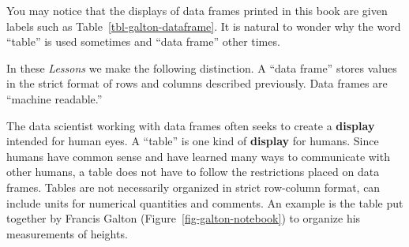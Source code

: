 \documentclass[
  letterpaper,
  DIV=11,
  numbers=noendperiod,
  oneside]{scrartcl}
\begin{document}
\begin{tcolorbox}[enhanced jigsaw, colbacktitle=quarto-callout-note-color!10!white, opacityback=0, breakable, opacitybacktitle=0.6, colback=white, coltitle=black, arc=.35mm, title=\textcolor{quarto-callout-note-color}{\faInfo}\hspace{0.5em}{Tables versus data frames}, left=2mm, colframe=quarto-callout-note-color-frame, rightrule=.15mm, bottomrule=.15mm, leftrule=.75mm, bottomtitle=1mm, toptitle=1mm, titlerule=0mm, toprule=.15mm]

You may notice that the displays of data frames printed in this book are
given labels such as Table~\ref{tbl-galton-dataframe}. It is natural to
wonder why the word ``table'' is used sometimes and ``data frame'' other
times.

In these \emph{Lessons} we make the following distinction. A ``data
frame'' stores values in the strict format of rows and columns described
previously. Data frames are ``machine readable.''

The data scientist working with data frames often seeks to create a
\textbf{display} intended for human eyes. A ``table'' is one kind of
\textbf{display} for humans. Since humans have common sense and have
learned many ways to communicate with other humans, a table does not
have to follow the restrictions placed on data frames. Tables are not
necessarily organized in strict row-column format, can include units for
numerical quantities and comments. An example is the table put together
by Francis Galton (Figure~\ref{fig-galton-notebook}) to organize his
measurements of heights.

\begin{figure}[H]




\end{figure}
\end{tcolorbox}
\end{document}
